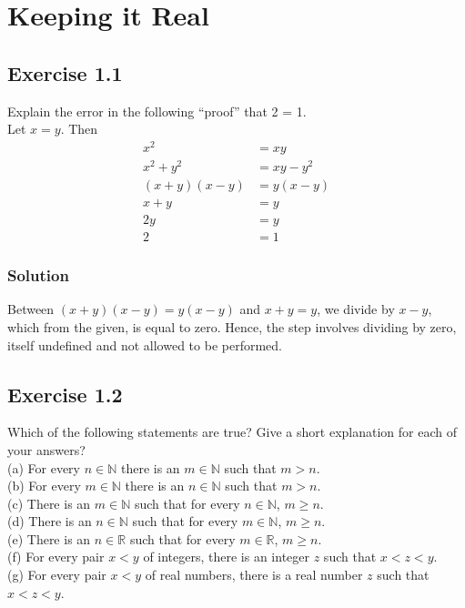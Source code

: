 \documentclass[12pt]{report}
\begin{document}
\tableofcontents
\pagebreak
\chapter{Keeping it Real}
\section{Exercise 1.1}
Explain the error in the following ``proof'' that 2 = 1.\\
Let $x = y$. Then
\begin{align*}
    x^2 &= xy\\
    x^2 + y^2 &= xy - y^2\\
    (x + y)(x - y) &= y(x - y)\\
    x + y &= y\\
    2y &= y\\
    2 &= 1
\end{align*}

\subsection*{Solution}
Between \((x + y)(x - y) = y(x - y)\) and \(x + y = y\), we divide by \(x - y\), which from the given, is equal to zero. Hence, the step involves dividing by zero, itself undefined and not allowed to be performed.

\pagebreak
\section{Exercise 1.2}
Which of the following statements are true? Give a short explanation for each of your answers?\\
(a) For every $n \in \mathbb{N}$ there is an $m \in \mathbb{N}$ such that $m > n$.\\
(b) For every $m \in \mathbb{N}$ there is an $n \in \mathbb{N}$ such that $m > n$.\\
(c) There is an $m \in \mathbb{N}$ such that for every $n \in \mathbb{N}$, $m \ge n$.\\
(d) There is an $n \in \mathbb{N}$ such that for every $m \in \mathbb{N}$, $m \ge n$.\\
(e) There is an $n \in \mathbb{R}$ such that for every $m \in \mathbb{R}$, $m \ge n$.\\
(f) For every pair $x < y$ of integers, there is an integer $z$ such that $x < z < y$.\\
(g) For every pair $x < y$ of real numbers, there is a real number $z$ such that $x < z < y$.
\end{document}
